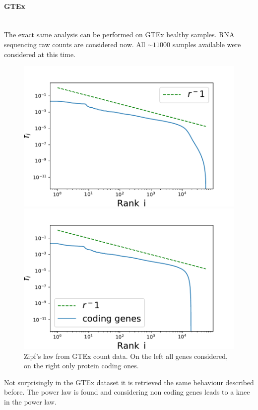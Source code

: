 \paragraph{GTEx}\mbox{} \\
The exact same analysis can be performed on GTEx healthy samples. RNA sequencing raw counts are considered now. All $\sim11000$ samples available were considered at this time.
\begin{figure}[htb!]
    \centering
    \begin{minipage}{0.45\textwidth}
    \includegraphics[width=0.95\linewidth]{pictures/structure/gtex/globalZipf.pdf}
    \end{minipage}
    \hspace{2mm}
    \begin{minipage}{0.45\textwidth}
    \includegraphics[width=0.95\linewidth]{pictures/structure/gtex/globalZipf_c.pdf}
    \end{minipage}
    \caption{Zipf's law from GTEx count data. On the left all genes considered, on the right only protein coding ones.}
    \label{fig:my_label}
\end{figure}
Not surprisingly in the GTEx dataset it is retrieved the same behaviour described before. The power law is found and considering non coding genes leads to a knee in the power law.

